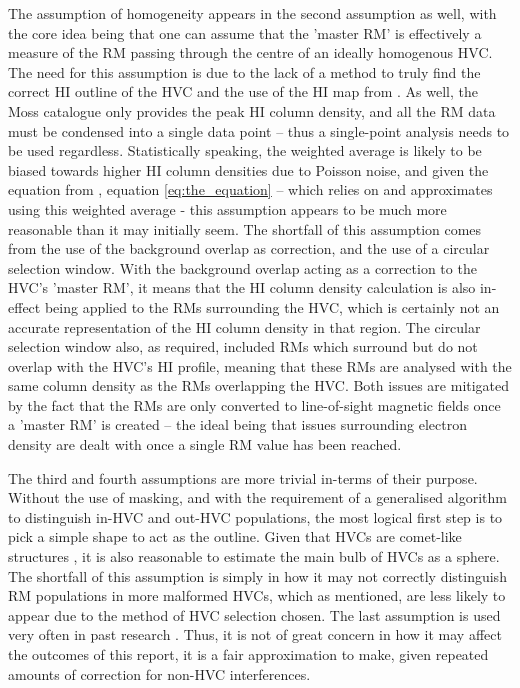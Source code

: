 The assumption of homogeneity appears in the second assumption as well, with the core idea being that one can assume that the 'master RM' is effectively a measure of the RM passing through the centre of an ideally homogenous HVC. The need for this assumption is due to the lack of a method to truly find the correct HI outline of the HVC and the use of the HI map from \cite{ID6}. As well, the Moss catalogue only provides the peak HI column density, and all the RM data must be condensed into a single data point – thus a single-point analysis needs to be used regardless.  Statistically speaking, the weighted average is likely to be biased towards higher HI column densities due to Poisson noise, and given the equation from \cite{ID27}, equation \ref{eq:the_equation} – which relies on and approximates using this weighted average - this assumption appears to be much more reasonable than it may initially seem. The shortfall of this assumption comes from the use of the background overlap as correction, and the use of a circular selection window. With the background overlap acting as a correction to the HVC's 'master RM', it means that the HI column density calculation is also in-effect being applied to the RMs surrounding the HVC, which is certainly not an accurate representation of the HI column density in that region. The circular selection window also, as required, included RMs which surround but do not overlap with the HVC's HI profile, meaning that these RMs are analysed with the same column density as the RMs overlapping the HVC. Both issues are mitigated by the fact that the RMs are only converted to line-of-sight magnetic fields once a 'master RM' is created – the ideal being that issues surrounding electron density are dealt with once a single RM value has been reached.


The third and fourth assumptions are more trivial in-terms of their purpose. Without the use of masking, and with the requirement of a generalised algorithm to distinguish in-HVC and out-HVC populations, the most logical first step is to pick a simple shape to act as the outline. Given that HVCs are comet-like structures \citep{ID13}, it is also reasonable to estimate the main bulb of HVCs as a sphere. The shortfall of this assumption is simply in how it may not correctly distinguish RM populations in more malformed HVCs, which as mentioned, are less likely to appear due to the method of HVC selection chosen. The last assumption is used very often in past research \citep{ID27,ID3, ID26, ID5}. Thus, it is not of great concern in how it may affect the outcomes of this report, it is a fair approximation to make, given repeated amounts of correction for non-HVC interferences.


